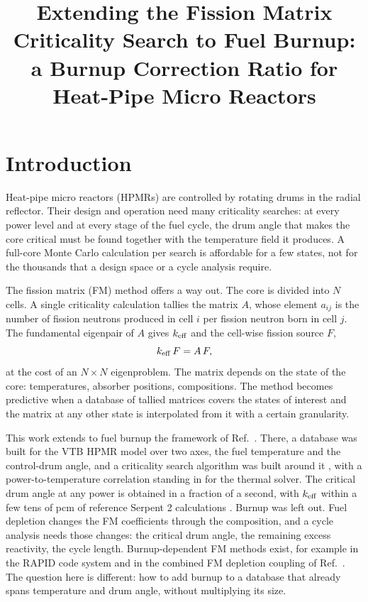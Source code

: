 \documentclass[]{ANStopical}
\title{Extending the Fission Matrix Criticality Search to Fuel Burnup: a Burnup Correction Ratio for Heat-Pipe Micro Reactors}
\begin{document}
\section{Introduction}\label{sec:intro}

Heat-pipe micro reactors (HPMRs) are controlled by rotating drums in the radial reflector. Their design and operation need many criticality searches: at every power level and at every stage of the fuel cycle, the drum angle that makes the core critical must be found together with the temperature field it produces. A full-core Monte Carlo calculation per search is affordable for a few states, not for the thousands that a design space or a cycle analysis require.

The fission matrix (FM) method \cite{carney2014,walters2018rapid} offers a way out. The core is divided into $N$ cells. A single criticality calculation tallies the matrix $A$, whose element $a_{ij}$ is the number of fission neutrons produced in cell $i$ per fission neutron born in cell $j$. The fundamental eigenpair of $A$ gives $k_{\rm eff}$ and the cell-wise fission source $F$,
\begin{equation}
    k_{\rm eff}\,F = A\,F ,
    \label{eq:fm}
\end{equation}
at the cost of an $N\times N$ eigenproblem. The matrix depends on the state of the core: temperatures, absorber positions, compositions. The method becomes predictive when a database of tallied matrices covers the states of interest and the matrix at any other state is interpolated from it with a certain granularity.

This work extends to fuel burnup the framework of Ref.~\cite{vita2026fm}. There, a database was built for the VTB HPMR model \cite{ortensi2024hpmr} over two axes, the fuel temperature and the control-drum angle, and a criticality search algorithm was built around it \cite{vita2025fim4ntra}, with a power-to-temperature correlation standing in for the thermal solver. The critical drum angle at any power is obtained in a fraction of a second, with $k_{\rm eff}$ within a few tens of pcm of reference Serpent 2 calculations \cite{leppanen2015serpent}. Burnup was left out. Fuel depletion changes the FM coefficients through the composition, and a cycle analysis needs those changes: the critical drum angle, the remaining excess reactivity, the cycle length. Burnup-dependent FM methods exist, for example in the RAPID code system \cite{pungercic2023brapid} and in the combined FM depletion coupling of Ref.~\cite{he2024combined}. The question here is different: how to add burnup to a database that already spans temperature and drum angle, without multiplying its size.
\end{document}
